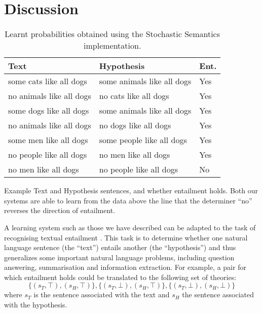 \documentclass[a4paper,11pt]{article}
\renewcommand{\cite}{\citep}
\theoremstyle{definition}
\begin{document}
\section{Discussion}

\begin{table*}
  \parbox{.62\linewidth}{
    \begin{center}
      \begin{tabular}{|l|l|l|}
        \hline
        Text & Hypothesis & Ent.\\
        \hline
        some cats like all dogs & some animals like all dogs & Yes\\
        no animals like all dogs & no cats like all dogs & Yes\\
        some dogs like all dogs & some animals like all dogs & Yes\\
        no animals like all dogs & no dogs like all dogs & Yes\\
        some men like all dogs & some people like all dogs & Yes\\
        \hline
        no people like all dogs & no men like all dogs & Yes\\
        no men like all dogs & no people like all dogs & No\\
        \hline
      \end{tabular}
      \caption{Example Text and Hypothesis sentences, and whether
        entailment holds. Both our systems are able to learn from the
        data above the line that the determiner ``no'' reverses the
        direction of entailment.}
      \label{table:mono}
    \end{center}
  }
  \hfill
  \parbox{.32\linewidth}{
    \centering
    \caption{Learnt probabilities obtained using the
      Stochastic Semantics implementation.}
    \label{table:lexical-sato}
  }
\end{table*}

A learning system such as those we have described can be adapted to
the task of recognising textual entailment \cite{Dagan:05}. This task is
to determine whether one natural language sentence (the ``text'')
entails another (the ``hypothesis'') and thus generalizes some
important natural language problems, including question answering,
summarisation and information extraction.  For example, a pair for
which entailment holds could be translated to the following set of
theories:
\[
\{(s_T,\top),(s_H,\top)\},  \{(s_T,\bot),(s_H,\top)\},\{(s_T,\bot),(s_H,\bot)\}
\]
where $s_T$ is the sentence associated with the text and $s_H$ the
sentence associated with the hypothesis.
\end{document}
